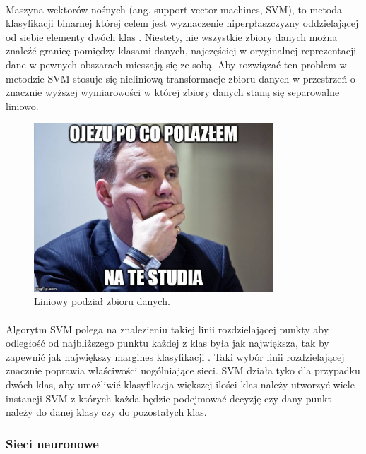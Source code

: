 \documentclass[a4paper,12pt,twoside]{article}
\begin{document}
\paragraph{}
Maszyna wektorów nośnych (ang. support vector machines, SVM), to metoda klasyfikacji binarnej której celem jest wyznaczenie hiperpłaszczyzny oddzielającej od siebie elementy dwóch klas \cite{svm}. Niestety, nie wszystkie zbiory danych można znaleźć granicę pomiędzy klasami danych, najczęściej w oryginalnej reprezentacji dane w pewnych obszarach mieszają się ze sobą. Aby rozwiązać ten problem w metodzie SVM stosuje się nieliniową transformacje zbioru danych w przestrzeń o znacznie wyższej wymiarowości w której zbiory danych staną się separowalne liniowo. 
\begin{figure}[h]
    \centering
    \includegraphics[width=0.8\textwidth]{dudel.jpg}
    \caption{Liniowy podział zbioru danych.}
\end{figure}
\paragraph{}
Algorytm SVM polega na znalezieniu takiej linii rozdzielającej punkty aby odległość od najbliższego punktu każdej z klas była jak największa, tak by zapewnić jak największy margines klasyfikacji \cite{svm}. Taki wybór linii rozdzielającej znacznie poprawia właściwości uogólniające sieci. SVM działa tyko dla przypadku dwóch klas, aby umożliwić klasyfikacja większej ilości klas należy utworzyć wiele instancji SVM z których każda będzie podejmować decyzję czy dany punkt należy do danej klasy czy do pozostałych klas. 

\newpage
\subsubsection{Sieci neuronowe}
\end{document}
